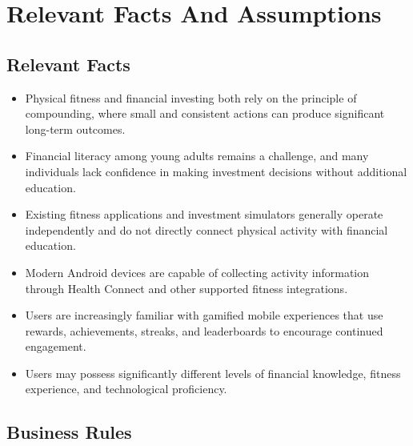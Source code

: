 \documentclass[12pt]{article}
\begin{document}
\section{Relevant Facts And Assumptions}
\subsection{Relevant Facts}

\begin{itemize} 
  \item Physical fitness and financial investing both rely on the principle of compounding, where small and consistent actions can produce significant long-term outcomes. 
  \item Financial literacy among young adults remains a challenge, and many individuals lack confidence in making investment decisions without additional education. 
  \item Existing fitness applications and investment simulators generally operate independently and do not directly connect physical activity with financial education. 
  \item Modern Android devices are capable of collecting activity information through Health Connect and other supported fitness integrations. 
  \item Users are increasingly familiar with gamified mobile experiences that use rewards, achievements, streaks, and leaderboards to encourage continued engagement. 
  \item Users may possess significantly different levels of financial knowledge, fitness experience, and technological proficiency. 
\end{itemize}

\subsection{Business Rules}
\end{document}

